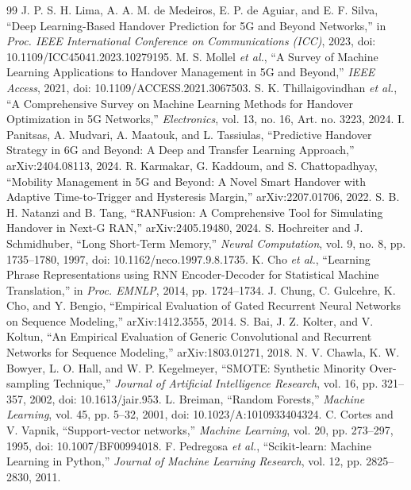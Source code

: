 \documentclass[conference]{IEEEtran}
\begin{document}
\begin{thebibliography}{99}
 J. P. S. H. Lima, A. A. M. de Medeiros, E. P. de Aguiar, and E. F. Silva, ``Deep Learning-Based Handover Prediction for 5G and Beyond Networks,'' in \emph{Proc. IEEE International Conference on Communications (ICC)}, 2023, doi: 10.1109/ICC45041.2023.10279195.
 M. S. Mollel \emph{et al.}, ``A Survey of Machine Learning Applications to Handover Management in 5G and Beyond,'' \emph{IEEE Access}, 2021, doi: 10.1109/ACCESS.2021.3067503.
 S. K. Thillaigovindhan \emph{et al.}, ``A Comprehensive Survey on Machine Learning Methods for Handover Optimization in 5G Networks,'' \emph{Electronics}, vol. 13, no. 16, Art. no. 3223, 2024.
 I. Panitsas, A. Mudvari, A. Maatouk, and L. Tassiulas, ``Predictive Handover Strategy in 6G and Beyond: A Deep and Transfer Learning Approach,'' arXiv:2404.08113, 2024.
 R. Karmakar, G. Kaddoum, and S. Chattopadhyay, ``Mobility Management in 5G and Beyond: A Novel Smart Handover with Adaptive Time-to-Trigger and Hysteresis Margin,'' arXiv:2207.01706, 2022.
 S. B. H. Natanzi and B. Tang, ``RANFusion: A Comprehensive Tool for Simulating Handover in Next-G RAN,'' arXiv:2405.19480, 2024.
 S. Hochreiter and J. Schmidhuber, ``Long Short-Term Memory,'' \emph{Neural Computation}, vol. 9, no. 8, pp. 1735--1780, 1997, doi: 10.1162/neco.1997.9.8.1735.
 K. Cho \emph{et al.}, ``Learning Phrase Representations using RNN Encoder-Decoder for Statistical Machine Translation,'' in \emph{Proc. EMNLP}, 2014, pp. 1724--1734.
 J. Chung, C. Gulcehre, K. Cho, and Y. Bengio, ``Empirical Evaluation of Gated Recurrent Neural Networks on Sequence Modeling,'' arXiv:1412.3555, 2014.
 S. Bai, J. Z. Kolter, and V. Koltun, ``An Empirical Evaluation of Generic Convolutional and Recurrent Networks for Sequence Modeling,'' arXiv:1803.01271, 2018.
 N. V. Chawla, K. W. Bowyer, L. O. Hall, and W. P. Kegelmeyer, ``SMOTE: Synthetic Minority Over-sampling Technique,'' \emph{Journal of Artificial Intelligence Research}, vol. 16, pp. 321--357, 2002, doi: 10.1613/jair.953.
 L. Breiman, ``Random Forests,'' \emph{Machine Learning}, vol. 45, pp. 5--32, 2001, doi: 10.1023/A:1010933404324.
 C. Cortes and V. Vapnik, ``Support-vector networks,'' \emph{Machine Learning}, vol. 20, pp. 273--297, 1995, doi: 10.1007/BF00994018.
 F. Pedregosa \emph{et al.}, ``Scikit-learn: Machine Learning in Python,'' \emph{Journal of Machine Learning Research}, vol. 12, pp. 2825--2830, 2011.
\end{thebibliography}
\end{document}

